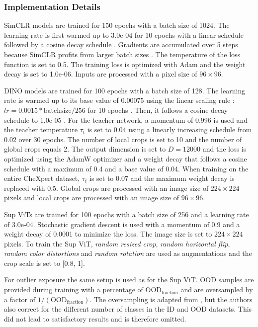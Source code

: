 \subsubsection{Implementation Details}
SimCLR models are trained for 150 epochs with a batch size of 1024.
The learning rate is first warmed up to 3.0e-04 for 10 epochs with a linear schedule \citep{Goyal2017} followed by a cosine decay schedule \citep{Chen2020,Loshchilov2016}. 
Gradients are accumulated over 5 steps because SimCLR profits from larger batch sizes \citep{Chen2020}.
The temperature of the loss function is set to 0.5. 
The training loss is optimized with Adam \citep{Kingma2014} and the weight decay is set to 1.0e-06.
Inputs are processed with a pixel size of $96\times96$.
\par
DINO models are trained for 100 epochs with a batch size of 128.
The learning rate is warmed up to its base value of $0.00075$ using the linear scaling rule \citep{Goyal2017}: $lr= 0.0015 * \text{batchsize}/256$ for 10 epochs \citep{Caron2021}.
Then, it follows a cosine decay schedule to 1.0e-05 \citep{Chen2020,Loshchilov2016}.
For the teacher network, a momentum of 0.996 is used and the teacher temperature $\tau_t$ is set to 0.04 using a linearly increasing schedule from 0.02 over 30 epochs.
The number of local crops is set to 10 and the number of global crops equals 2.
The output dimension is set to $D=12000$ and the loss is optimized using the AdamW optimizer \citep{Loshchilov2018} and a weight decay that follows a cosine schedule with a maximum of 0.4 and a base value of 0.04.
When training on the entire CheXpert dataset, $\tau_t$ is set to 0.07 and the maximum weight decay is replaced with 0.5.
Global crops are processed with an image size of $224\times224$ pixels and local crops are processed with an image size of $96\times96$.
\par
Sup ViTs are trained for 100 epochs with a batch size of 256 and a learning rate of 3.0e-04. 
Stochastic gradient descent is used with a momentum of 0.9 and a weight decay of 0.0001 to minimize the loss.
The image size is set to $224\times224$ pixels.
To train the Sup ViT, \textit{random resized crop}, \textit{random horizontal flip}, \textit{random color distortions} and \textit{random rotation} are used as augmentations and the crop scale is set to [0.8, 1].
\par
For outlier exposure the same setup is used as for the Sup ViT.
OOD samples are provided during training with a percentage of $\text{OOD}_\text{fraction}$ and are oversampled by a factor of $1/(\text{OOD}_\text{fraction})$.
The oversampling is adapted from \citep{Fort2021}, but the authors also correct for the different number of classes in the ID and OOD datasets.
This did not lead to satisfactory results and is therefore omitted.
